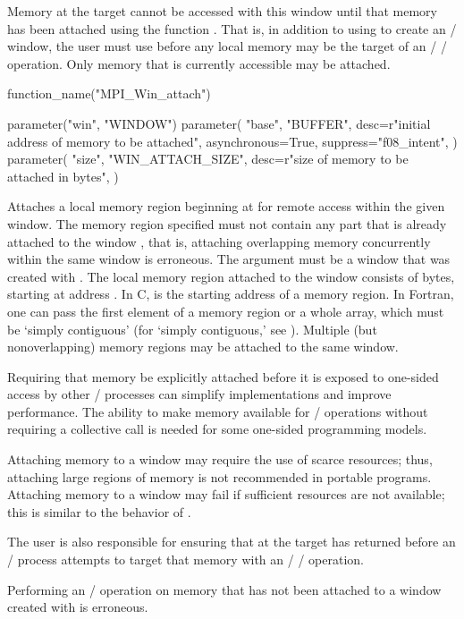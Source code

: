 Memory at the target cannot be accessed with this window until that memory
has been
attached using the function .
That is, in addition to using  to
create an \MPI/ window, the user must use 
before any local memory may be the target of an \MPI/ \RMA/ operation.
Only memory that is currently accessible may be attached.  

\begin{mpi-binding}
    function_name("MPI_Win_attach")
    
    parameter("win", "WINDOW")
    parameter(
        "base",
        "BUFFER",
        desc=r"initial address of memory to be attached",
        asynchronous=True,
        suppress="f08_intent",
    )
    parameter(
        "size",
        "WIN_ATTACH_SIZE",
        desc=r"size of memory to be attached in bytes",
    )
\end{mpi-binding}

Attaches a local memory region beginning at
 for remote access within the given window. The memory region
specified must not contain any part that is already attached to the
window ,
that is, attaching overlapping memory concurrently within the same window is
erroneous. The argument  must be a window that was created with
.
The local memory region attached to the window consists of  bytes,
starting at address .
In C,  is the starting address of a
memory region. In Fortran, one can pass the first element of a memory
region or a whole array, which must be `simply contiguous' (for
`simply contiguous,' see ).
Multiple (but nonoverlapping) memory
regions may be attached to the same window.

\begin{rationale}
Requiring that memory be explicitly attached before it is exposed to
one-sided access by other \mpi/ processes can
simplify
implementations and improve performance. The ability to make memory
available for \RMA/ operations without requiring a collective
 call is needed for some one-sided programming
models.
\end{rationale}

\begin{users}
Attaching memory to a window may require the use of scarce resources; thus,
attaching large regions of memory is not recommended in portable
programs.  Attaching memory to a window may fail if sufficient resources are
not available; this is similar to the behavior of
.

The user is also responsible for ensuring that  at
the target has returned before an \mpi/ process attempts to target that
memory with an \MPI/ \RMA/ operation.

Performing an \RMA/ operation on memory that has not been attached to
a window created with  is
erroneous.   %
\end{users}


